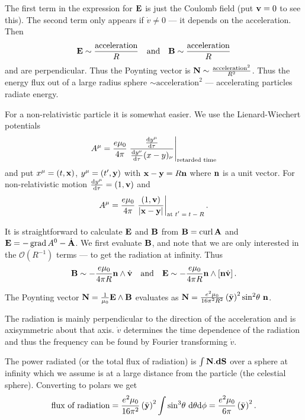\documentclass{notes}
\newcommand{\cO}{\mathcal{O}}
\newcommand{\B}{\vect{B}}
\newcommand{\E}{\vect{E}}
\DeclareMathOperator{\curl}{curl}
\DeclareMathOperator{\grad}{grad}
\begin{document}
The first term in the expression for $\E$ is just the Coulomb field
(put $\mathbf{v} = 0$ to see this).  The second term only appears if
$\dot{v} \neq 0$ --- it depends on the acceleration.  Then
\[
\E \sim \frac{\text{acceleration}}{R} \quad \text{and} \quad
\B \sim \frac{\text{acceleration}}{R}
\]
and are perpendicular.  Thus the Poynting vector is $\mathbf{N} \sim
\frac{\text{acceleration}^2}{R^2}$.  Thus the energy flux out of
a large radius sphere $\sim \text{acceleration}^2$ --- accelerating particles
radiate energy.

For a non-relativistic particle it is somewhat easier.  We use the
Lienard-Wiechert potentials
\[
A^\mu = \frac{e \mu_0}{4 \pi} \left. \frac{\frac{\mathrm{d} y^\mu}{\mathrm{d}\tau}}
{\frac{\mathrm{d} y^\nu}{\mathrm{d}\tau}(x-y)_\nu} \right|_{\text{retarded time}}
\]
and put $x^\mu = (t,\mathbf{x})$, $y^\mu = (t',\mathbf{y})$ with $\mathbf{x} - \mathbf{y}
= R \mathbf{n}$ where $\mathbf{n}$ is a unit vector.  For non-relativistic
motion $\frac{\mathrm{d} y^\mu}{\mathrm{d}\tau} = (1,\mathbf{v})$ and
\[
A^\mu = \frac{e \mu_0}{4 \pi} \left. \frac{(1,\mathbf{v})}{\left|\mathbf{x} - \mathbf{y}\right|}
\right|_{\text{at $t' = t - R$}}.
\]

It is straightforward to calculate $\E$ and $\B$ from $\B = \curl \vect{A}$
and $\E = -\grad A^0 - \dot{\vect{A}}$.  We first evaluate $\B$, and note that
we are only interested in the $\cO(R^{-1})$ terms --- to get the radiation
at infinity.  Thus
\[
\B \sim - \frac{e \mu_0}{4 \pi R} \vect{n} \wedge \dot{\vect{v}}
\quad \text{and} \quad
\E \sim - \frac{e \mu_0}{4 \pi R} \vect{n} \wedge \left[
\vect{n} \dot{\vect{v}} \right].
\]

The Poynting vector $\vect{N} = \frac{1}{\mu_0} \E \wedge \B$ evaluates as
$\mathbf{N} = \frac{e^2 \mu_0}{16 \pi^2 R^2} \left( \ddot{\mathbf{y}} \right)^2
\sin^2\! \theta\ \mathbf{n}$.

\vspace{1in}

The radiation is mainly perpendicular to the direction of the acceleration
and is axisymmetric about that axis.  $\dot{v}$ determines the time dependence
of the radiation and thus the frequency can be found by Fourier transforming
$\dot{v}$.

The power radiated (or the total flux of radiation) is
$\int \mathbf{N}.\mathbf{dS}$ over a sphere at infinity which we assume is at a
large distance from the particle (the celestial sphere).
Converting to polars we get
\[
\text{flux of radiation}
= \frac{e^2 \mu_0}{16 \pi^2} \left( \ddot{\mathbf{y}} \right)^2
\int \sin^3\! \theta\ \mathrm{d} \theta \mathrm{d} \phi = \frac{e^2 \mu_0}{6 \pi}
\left( \ddot{\mathbf{y}} \right)^2.
\]
\end{document}
